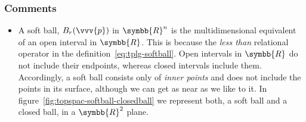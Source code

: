 \subsubsection{Comments}
\begin{itemize}
\item A soft ball, $B_r(\vvv{p})$ in $\symbb{R}^n$ is the multidimensional equivalent of an open
  interval in $\symbb{R}$. This is because the \emph{less than} relational operator in the
  definition~\eqref{eq:tplg-softball}. Open intervals in $\symbb{R}$ do not include their endpoints,
  whereas closed intervals include them. Accordingly, a soft ball consists only of \emph{inner points}
  and does not include the points in its surface, although we can get as near as we like to it.
  In figure~\eqref{fig:topspac-softball-closedball} we represent both, a soft ball and a closed
  ball, in a $\symbb{R}^2$ plane.
  \begin{figure}[ht]
    \def\scl{1}
    \pgfmathsetmacro{\XBOTTOMLEFT}{\XCENTER - (\XSPACE + \RADIUS)}
    \pgfmathsetmacro{\YBOTTOMLEFT}{(\YCENTER - (\YSPACE + \RADIUS)}
    \pgfmathsetmacro{\XTOPRIGHT}{\XCENTER + (\XSPACE + \RADIUS)}
    \pgfmathsetmacro{\YTOPRIGHT}{\YCENTER + (\YSPACE + \RADIUS)}
    \centering
\end{figure}
\end{itemize}
